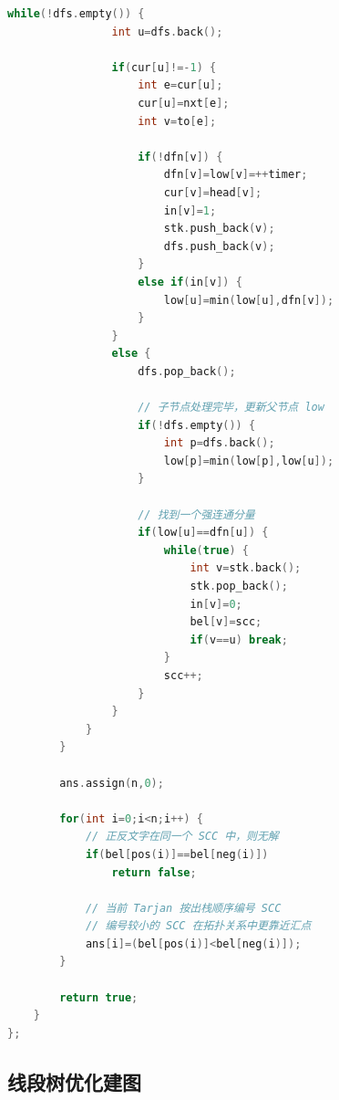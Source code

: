 \documentclass[a4paper,9pt]{extarticle}
\begin{document}
\begin{lstlisting}[language={C++}]
            while(!dfs.empty()) {
                int u=dfs.back();

                if(cur[u]!=-1) {
                    int e=cur[u];
                    cur[u]=nxt[e];
                    int v=to[e];

                    if(!dfn[v]) {
                        dfn[v]=low[v]=++timer;
                        cur[v]=head[v];
                        in[v]=1;
                        stk.push_back(v);
                        dfs.push_back(v);
                    }
                    else if(in[v]) {
                        low[u]=min(low[u],dfn[v]);
                    }
                }
                else {
                    dfs.pop_back();

                    // 子节点处理完毕，更新父节点 low
                    if(!dfs.empty()) {
                        int p=dfs.back();
                        low[p]=min(low[p],low[u]);
                    }

                    // 找到一个强连通分量
                    if(low[u]==dfn[u]) {
                        while(true) {
                            int v=stk.back();
                            stk.pop_back();
                            in[v]=0;
                            bel[v]=scc;
                            if(v==u) break;
                        }
                        scc++;
                    }
                }
            }
        }

        ans.assign(n,0);

        for(int i=0;i<n;i++) {
            // 正反文字在同一个 SCC 中，则无解
            if(bel[pos(i)]==bel[neg(i)])
                return false;

            // 当前 Tarjan 按出栈顺序编号 SCC
            // 编号较小的 SCC 在拓扑关系中更靠近汇点
            ans[i]=(bel[pos(i)]<bel[neg(i)]);
        }

        return true;
    }
};
\end{lstlisting}
\subsection{线段树优化建图}
\end{document}
